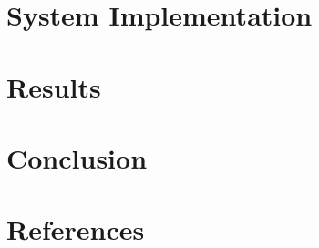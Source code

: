 \documentclass[12pt]{article}
\begin{document}
\fi


\section{System Implementation}


\section{Results}


\section{Conclusion}


\section{References}
\end{document}
